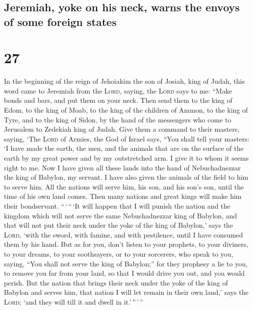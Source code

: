 \hypertarget{jeremiah-yoke-on-his-neck-warns-the-envoys-of-some-foreign-states}{%
\subsection{Jeremiah, yoke on his neck, warns the envoys of some foreign
states}\label{jeremiah-yoke-on-his-neck-warns-the-envoys-of-some-foreign-states}}

\hypertarget{section-26}{%
\section{27}\label{section-26}}

 In the beginning of the reign of Jehoiakim the son of
Josiah, king of Judah, this word came to Jeremiah from the
\textsc{Lord}, saying,  the \textsc{Lord} says to me:
``Make bonds and bars, and put them on your neck.  Then
send them to the king of Edom, to the king of Moab, to the king of the
children of Ammon, to the king of Tyre, and to the king of Sidon, by the
hand of the messengers who come to Jerusalem to Zedekiah king of Judah.
 Give them a command to their masters, saying, `The
\textsc{Lord} of Armies, the God of Israel says, ``You shall tell your
masters:  `I have made the earth, the men, and the animals
that are on the surface of the earth by my great power and by my
outstretched arm. I give it to whom it seems right to me. 
Now I have given all these lands into the hand of Nebuchadnezzar the
king of Babylon, my servant. I have also given the animals of the field
to him to serve him.  All the nations will serve him, his
son, and his son's son, until the time of his own land comes. Then many
nations and great kings will make him their bondservant. 
``\,`\,``\,`It will happen that I will punish the nation and the kingdom
which will not serve the same Nebuchadnezzar king of Babylon, and that
will not put their neck under the yoke of the king of Babylon,' says the
\textsc{Lord}, `with the sword, with famine, and with pestilence, until
I have consumed them by his hand.  But as for you, don't
listen to your prophets, to your diviners, to your dreams, to your
soothsayers, or to your sorcerers, who speak to you, saying, ``You shall
not serve the king of Babylon;''  for they prophesy a lie
to you, to remove you far from your land, so that I would drive you out,
and you would perish.  But the nation that brings their
neck under the yoke of the king of Babylon and serves him, that nation I
will let remain in their own land,' says the \textsc{Lord}; `and they
will till it and dwell in it.'\,''\,'\,''

